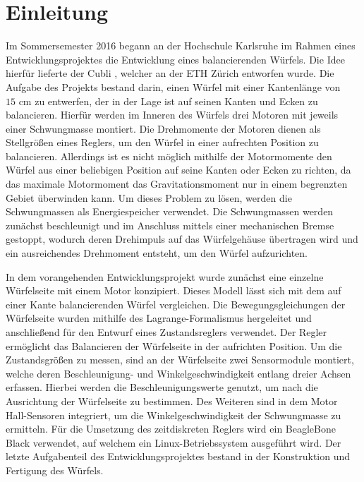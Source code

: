 \chapter{Einleitung}
Im Sommersemester 2016 begann an der Hochschule Karlsruhe im Rahmen eines Entwicklungsprojektes die Entwicklung eines balancierenden Würfels. Die Idee hierfür lieferte der Cubli \cite{Cubli1}, welcher an der ETH Zürich entworfen wurde. Die Aufgabe des Projekts bestand darin, einen Würfel mit einer Kantenlänge von $15\text{ cm}$ zu entwerfen, der in der Lage ist auf seinen Kanten und Ecken zu balancieren. Hierfür werden im Inneren des Würfels drei Motoren mit jeweils einer Schwungmasse montiert. Die Drehmomente der Motoren dienen als Stellgrößen eines Reglers, um den Würfel in einer aufrechten Position zu balancieren. Allerdings ist es nicht möglich mithilfe der Motormomente den Würfel aus einer beliebigen Position auf seine Kanten oder Ecken zu richten, da das maximale Motormoment das Gravitationsmoment nur in einem begrenzten Gebiet überwinden kann. Um dieses Problem zu lösen, werden die Schwungmassen als Energiespeicher verwendet. Die Schwungmassen werden zunächst beschleunigt und im Anschluss mittels einer mechanischen Bremse gestoppt, wodurch deren Drehimpuls auf das Würfelgehäuse übertragen wird und ein ausreichendes Drehmoment entsteht, um den Würfel aufzurichten.

In dem vorangehenden Entwicklungsprojekt wurde zunächst eine einzelne Würfelseite mit einem Motor konzipiert. Dieses Modell lässt sich mit dem auf einer Kante balancierenden Würfel vergleichen. Die Bewegungsgleichungen der Würfelseite wurden mithilfe des Lagrange-Formalismus hergeleitet und anschließend für den Entwurf eines Zustandsreglers verwendet. Der Regler ermöglicht das Balancieren der Würfelseite in der aufrichten Position. Um die Zustandsgrößen zu messen, sind an der Würfelseite zwei Sensormodule montiert, welche deren Beschleunigung- und Winkelgeschwindigkeit entlang dreier Achsen erfassen. Hierbei werden die Beschleunigungswerte genutzt, um nach \cite{Cubli1} die Ausrichtung der Würfelseite zu bestimmen. Des Weiteren sind in dem Motor Hall-Sensoren integriert, um die Winkelgeschwindigkeit der Schwungmasse zu ermitteln. Für die Umsetzung des zeitdiskreten Reglers wird ein BeagleBone Black verwendet, auf welchem ein Linux-Betriebssystem ausgeführt wird. Der letzte Aufgabenteil des Entwicklungsprojektes bestand in der Konstruktion und Fertigung des Würfels.

